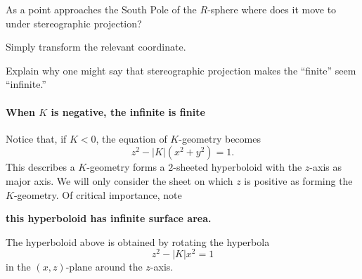 \documentclass{ximera}
\begin{document}
\begin{problem}
  As a point approaches the South Pole of the $R$-sphere where does it
  move to under stereographic projection?
  \begin{hint}
    Simply transform the relevant coordinate.
  \end{hint}
  \begin{freeResponse}
  \end{freeResponse}
\end{problem}



\begin{problem}
  Explain why one might say that stereographic projection makes the
  ``finite'' seem ``infinite.''
    \begin{freeResponse}
    \end{freeResponse}
\end{problem}




\paragraph{When $K$ is negative, the infinite is finite}


Notice that, if $K<0$, the equation of $K$-geometry becomes
\[
z^{2}-|K|\left(x^{2}+y^{2}\right)  =1.
\]
This describes a $K$-geometry forms a $2$-sheeted hyperboloid with the
$z$-axis as major axis. We will only consider the sheet on which $z$
is positive as forming the $K$-geometry.  Of critical importance, note

\begin{center}
  \textbf{this hyperboloid has infinite surface area.}
\end{center}

The hyperboloid above is obtained by rotating the hyperbola
\[
z^{2}-\left\vert K\right\vert x^{2}= 1
\]
in the $(x,z)$-plane around the $z$-axis.
\end{document}
